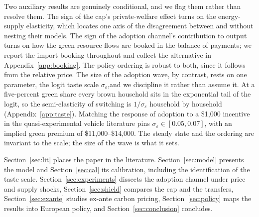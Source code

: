 Two auxiliary results are genuinely conditional, and we flag them rather than
resolve them. The sign of the cap's private-welfare effect turns on the
energy-supply elasticity, which locates one axis of the disagreement between
\citet{Langot2026} and \citet{Bayer2026} without nesting their models. The sign of
the adoption channel's contribution to output turns on how the green resource flows
are booked in the balance of payments; we report the import booking throughout and
collect the alternative in Appendix~\ref{app:booking}. The policy ordering is
robust to both, since it follows from the relative price. The size of the adoption
wave, by contrast, rests on one parameter, the logit taste scale
$\sigma_\varepsilon$,and we discipline it rather than assume it. At a five-percent
green share every brown household sits in the exponential tail of the logit, so the
semi-elasticity of switching is $1/\sigma_\varepsilon$ household by household
(Appendix~\ref{app:taste}). Matching the response of adoption to a \$1{,}000
incentive in the quasi-experimental vehicle literature \citep{GallagherMuehlegger2011,
Chandra2010, MuehleggerRapson2022} pins $\sigma_\varepsilon\in[0.05,0.07]$, with an
implied green premium of \$11{,}000--\$14{,}000. The steady state and the ordering
are invariant to the scale; the size of the wave is what it sets.

Section~\ref{sec:lit} places the paper in the literature.
Section~\ref{sec:model} presents the model and Section~\ref{sec:cal} its
calibration, including the identification of the taste scale.
Section~\ref{sec:experiments} dissects the adoption channel under price and supply
shocks, Section~\ref{sec:shield} compares the cap and the transfers,
Section~\ref{sec:exante} studies ex-ante carbon pricing,
Section~\ref{sec:policy} maps the results into European policy, and
Section~\ref{sec:conclusion} concludes.

